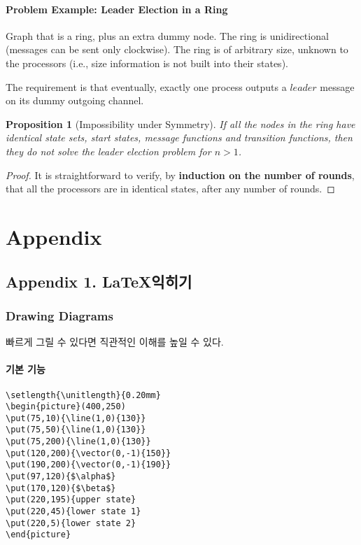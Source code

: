 \documentclass{report}
\theoremstyle{plain}
\newtheorem{prop}[thm]{Proposition}
\theoremstyle{definition}
\theoremstyle{remark}
\begin{document}
\subsubsection{Problem Example: Leader Election in a Ring}

Graph that is a ring, plus an extra dummy node. The ring is unidirectional 
(messages can be sent only clockwise). The ring is of arbitrary size, 
unknown to the processors (i.e., size information is not built into their states). 

The requirement is that eventually, exactly one process outputs a $leader$ 
message on its dummy outgoing channel. 

\begin{prop}[Impossibility under Symmetry]
If all the nodes in the ring have identical state sets, start states, message functions
and transition functions, then they do not solve the leader election problem for 
$n > 1$.
\end{prop}

\begin{proof}
It is straightforward to verify, by \textbf{induction on the number of rounds}, 
that all the processors are in identical states, after any number of rounds.

\end{proof}


\chapter{Appendix}
\section{Appendix 1. \LaTeX 익히기}

\subsection{Drawing Diagrams}

빠르게 그릴 수 있다면 직관적인 이해를 높일 수 있다. 

\subsubsection{기본 기능}

\begin{verbatim}
\setlength{\unitlength}{0.20mm}
\begin{picture}(400,250)
\put(75,10){\line(1,0){130}}
\put(75,50){\line(1,0){130}}
\put(75,200){\line(1,0){130}}
\put(120,200){\vector(0,-1){150}}
\put(190,200){\vector(0,-1){190}}
\put(97,120){$\alpha$}
\put(170,120){$\beta$}
\put(220,195){upper state}
\put(220,45){lower state 1}
\put(220,5){lower state 2}
\end{picture}
\end{verbatim}
\end{document}
